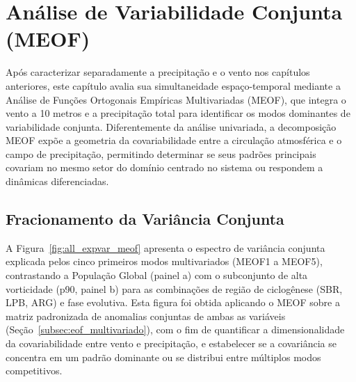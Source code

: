 \chapter{Análise de Variabilidade Conjunta (MEOF)}
\label{chap:meof}

Após caracterizar separadamente a precipitação e o vento nos capítulos anteriores, este capítulo avalia sua simultaneidade espaço-temporal mediante a Análise de Funções Ortogonais Empíricas Multivariadas (MEOF), que integra o vento a 10 metros e a precipitação total para identificar os modos dominantes de variabilidade conjunta.
Diferentemente da análise univariada, a decomposição MEOF expõe a geometria da covariabilidade entre a circulação atmosférica e o campo de precipitação, permitindo determinar se seus padrões principais covariam no mesmo setor do domínio centrado no sistema ou respondem a dinâmicas diferenciadas.

\section{Fracionamento da Variância Conjunta}
\label{sec:meof_varianza}

A Figura~\ref{fig:all_expvar_meof} apresenta o espectro de variância conjunta explicada pelos cinco primeiros modos multivariados (MEOF1 a MEOF5), contrastando a População Global (painel a) com o subconjunto de alta vorticidade (p90, painel b) para as combinações de região de ciclogênese (SBR, LPB, ARG) e fase evolutiva.
Esta figura foi obtida aplicando o MEOF sobre a matriz padronizada de anomalias conjuntas de ambas as variáveis (Seção~\ref{subsec:eof_multivariado}), com o fim de quantificar a dimensionalidade da covariabilidade entre vento e precipitação, e estabelecer se a covariância se concentra em um padrão dominante ou se distribui entre múltiplos modos competitivos.

